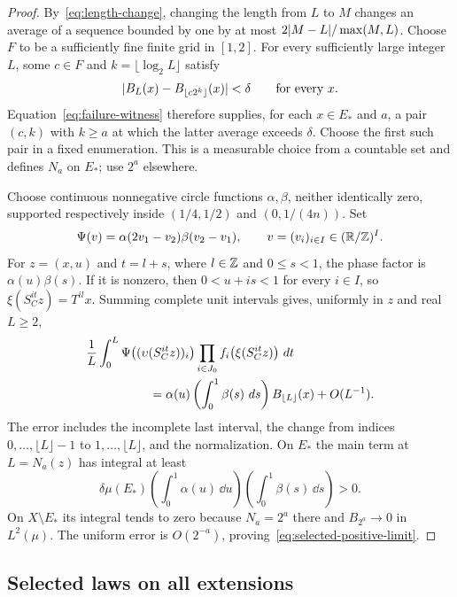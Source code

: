 \begin{proof}
By~\eqref{eq:length-change}, changing the length from $L$ to $M$
changes an average of a sequence bounded by one by at most
$2\lvert M-L\rvert/\max(M,L)$.  Choose $F$ to be a sufficiently fine finite
grid in $[1,2]$.  For every sufficiently large integer $L$, some
$c\in F$ and $k=\lfloor\log_2L\rfloor$ satisfy
\[
  \lvert B_L(x)-B_{\lfloor c2^k\rfloor}(x)\rvert<\delta
  \qquad\text{for every }x.
\]
Equation~\eqref{eq:failure-witness} therefore supplies, for each
$x\in E_*$ and $a$, a pair $(c,k)$ with $k\ge a$ at which the latter
average exceeds $\delta$.  Choose the first such pair in a fixed
enumeration.  This is a measurable choice from a countable set and
defines $N_a$ on $E_*$; use $2^a$ elsewhere.

Choose continuous nonnegative circle functions $\alpha,\beta$, neither
identically zero, supported respectively inside $(1/4,1/2)$ and
$(0,1/(4n))$.  Set
\begin{equation}\label{eq:phase-witness}
 \Psi(v)=\alpha(2v_1-v_2)\beta(v_2-v_1),
 \qquad v=(v_i)_{i\in I}\in(\mathbb R/\mathbb Z)^I.
\end{equation}
For $z=(x,u)$ and $t=l+s$, where $l\in\mathbb Z$ and $0\le s<1$, the
phase factor is $\alpha(u)\beta(s)$.  If it is nonzero, then
$0<u+is<1$ for every $i\in I$, so
$\xi(S_C^{it}z)=T^{il}x$.  Summing complete unit intervals gives,
uniformly in $z$ and real $L\ge2$,
\begin{align}
 &\frac1L\int_0^L
 \Psi\bigl((\upsilon(S_C^{it}z))_i\bigr)
 \prod_{i\in J_0}f_i\bigl(\xi(S_C^{it}z)\bigr)\,\dd t
 \notag\\
 &\hspace{18mm}
 =\alpha(u)\left(\int_0^1\beta(s)\,\dd s\right)
 B_{\lfloor L\rfloor}(x)+O(L^{-1}).
 \label{eq:suspension-witness}
\end{align}
The error includes the incomplete last interval, the change from
indices $0,\ldots,\lfloor L\rfloor-1$ to $1,\ldots,\lfloor L\rfloor$,
and the normalization.  On $E_*$ the main term at $L=N_a(z)$ has
integral at least
\[
 \delta\mu(E_*)
 \left(\int_0^1\alpha(u)\,\dd u\right)
 \left(\int_0^1\beta(s)\,\dd s\right)>0.
\]
On $X\setminus E_*$ its integral tends to zero because $N_a=2^a$
there and $B_{2^a}\to0$ in $L^2(\mu)$.  The uniform error is
$O(2^{-a})$, proving~\eqref{eq:selected-positive-limit}.
\end{proof}

\subsection{Selected laws on all extensions}

